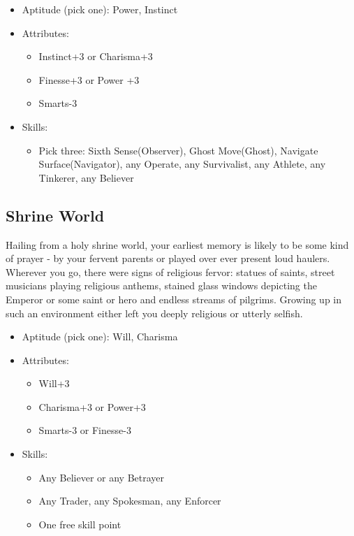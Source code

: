 	\begin{itemize}
		\item Aptitude (pick one): Power, Instinct
		\item Attributes:
		\begin{itemize}
			\item Instinct+3 or Charisma+3
			\item Finesse+3 or Power +3
			\item Smarts-3
		\end{itemize}
		\item Skills: 
		\begin{itemize}
		 	\item Pick three: Sixth Sense(Observer), Ghost Move(Ghost), Navigate Surface(Navigator), any Operate, any Survivalist, any Athlete, any Tinkerer, any Believer
		 \end{itemize} 
	\end{itemize}

	\subsection{Shrine World}
	Hailing from a holy shrine world, your earliest memory is likely to be some kind of prayer - by your fervent parents or played over ever present loud haulers. Wherever you go, there were signs of religious fervor: statues of saints, street musicians playing religious anthems, stained glass windows depicting the Emperor or some saint or hero and endless streams of pilgrims. Growing up in such an environment either left you deeply religious or utterly selfish.

	\begin{itemize}
		\item Aptitude (pick one): Will, Charisma
		\item Attributes:
		\begin{itemize}
			\item Will+3
			\item Charisma+3 or Power+3
			\item Smarts-3 or Finesse-3
		\end{itemize}
		\item Skills: 
		\begin{itemize}
		 	\item Any Believer or any Betrayer
		 	\item Any Trader, any Spokesman, any Enforcer
		 	\item One free skill point
		 \end{itemize} 
	\end{itemize}

